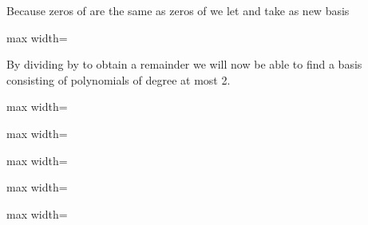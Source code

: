 \documentclass[11pt,oneside]{article}
\begin{document}
\begin{BookBody}
\noindent Because zeros of  are the same as zeros of  we let   and take as new basis

\begin{center}\begin{adjustbox}{max width=\linewidth}\end{adjustbox}\end{center}

\end{BookBody}

\BookNarrativetrue

\begin{BookBody}

By dividing  by  to obtain a remainder  we will now be able to find a basis  consisting of polynomials of degree at most 2.

\begin{center}\begin{adjustbox}{max width=\linewidth}\end{adjustbox}\end{center}

\begin{center}\begin{adjustbox}{max width=\linewidth}\end{adjustbox}\end{center}

\begin{center}\begin{adjustbox}{max width=\linewidth}\end{adjustbox}\end{center}

\begin{center}\begin{adjustbox}{max width=\linewidth}\end{adjustbox}\end{center}

\begin{center}\begin{adjustbox}{max width=\linewidth}\end{adjustbox}\end{center}


\end{BookBody}
\end{document}

